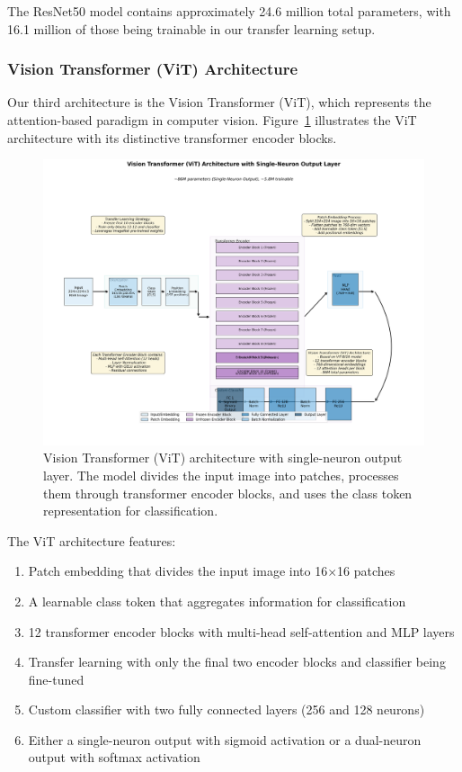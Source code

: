 The ResNet50 model contains approximately 24.6 million total parameters, with 16.1 million of those being trainable in our transfer learning setup.

\subsubsection{Vision Transformer (ViT) Architecture}

Our third architecture is the Vision Transformer (ViT), which represents the attention-based paradigm in computer vision. Figure~\ref{fig:vit_arch} illustrates the ViT architecture with its distinctive transformer encoder blocks.

\begin{figure}[htbp]
\centering
\includegraphics[width=\textwidth]{figures/vit_1neuron_architecture.png}
\caption{Vision Transformer (ViT) architecture with single-neuron output layer. The model divides the input image into patches, processes them through transformer encoder blocks, and uses the class token representation for classification.}
\label{fig:vit_arch}
\end{figure}

The ViT architecture features:
\begin{enumerate}
\item Patch embedding that divides the input image into 16×16 patches
\item A learnable class token that aggregates information for classification
\item 12 transformer encoder blocks with multi-head self-attention and MLP layers
\item Transfer learning with only the final two encoder blocks and classifier being fine-tuned
\item Custom classifier with two fully connected layers (256 and 128 neurons)
\item Either a single-neuron output with sigmoid activation or a dual-neuron output with softmax activation
\end{enumerate}


